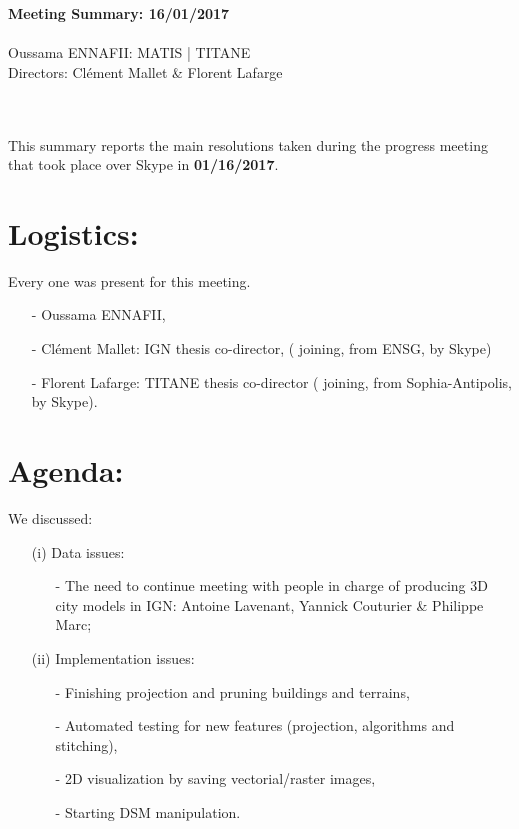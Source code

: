 \documentclass[a4paper, 11pt]{article}
\begin{document}
	\begin{centering}
		\large\textbf{Meeting Summary: 16/01/2017}\\
		~\\
		Oussama ENNAFII:
		\normalsize MATIS | TITANE \\
		Directors: Cl\'ement Mallet \& Florent Lafarge \\
	\end{centering}
	
	~\\~\\
	This summary reports the main resolutions taken during the progress meeting that took place over Skype in \textbf{01/16/2017}.
	\section*{Logistics:}
	Every one was present for this meeting.
	\begin{itemize}
		\item[-] Oussama ENNAFII,
		\item[-] Cl\'ement Mallet: IGN thesis co-director, ( joining, from ENSG, by Skype)
		\item[-] Florent Lafarge: TITANE thesis co-director ( joining, from Sophia-Antipolis, by Skype).
	\end{itemize}
	
	\section*{Agenda:}
	
	We discussed: 
	\begin{itemize}
		\item[(i)] Data issues:
		\begin{itemize}
			\item[-] The need to continue meeting with people in charge of producing 3D city models in IGN: Antoine Lavenant, Yannick Couturier \& Philippe Marc;
		\end{itemize}
		\item[(ii)] Implementation issues:
		\begin{itemize}
			\item[-] Finishing projection and pruning buildings and terrains,
			\item[-] Automated testing for new features (projection, algorithms and stitching),
			\item[-] 2D visualization by saving vectorial/raster images,
			\item[-] Starting DSM manipulation.
		\end{itemize}
	\end{itemize}
	
\end{document}
